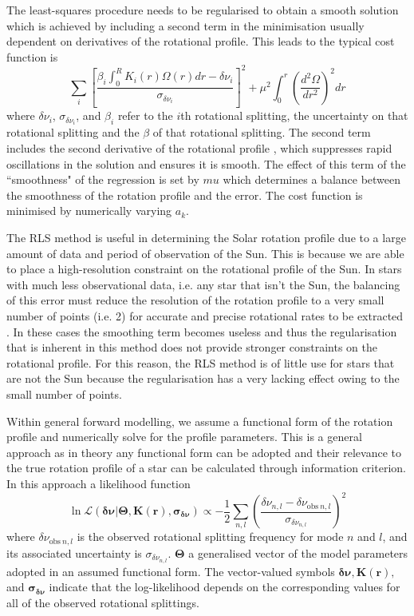 The least-squares procedure needs to be regularised to obtain a smooth solution which is achieved by including a second term in the minimisation usually dependent on derivatives of the rotational profile.
This leads to the typical cost function is
\begin{equation}
    \sum_i \left[ \frac{ \beta_{i} \int^R_0 K_i(r) \Omega(r)  dr - \delta \nu_i }{\sigma_{\delta \nu_i}} \right]^2 + \mu^2 \int^r_0 \left(\frac{d^2 \Omega}{d r^2}\right)^2 d r    
\end{equation}
where $\delta \nu_i$, $\sigma_{\delta \nu_i}$, and $\beta_i$ refer to the $i$th rotational splitting, the uncertainty on that rotational splitting and the $\beta$ of that rotational splitting.
The second term includes the second derivative of the rotational profile \citep{craig_inverse_1986}, which suppresses rapid oscillations in the solution and ensures it is smooth. 
The effect of this term of the ``smoothness" of the regression is set by $mu$ which determines a balance between the smoothness of the rotation profile and the error.
The cost function is minimised by numerically varying $a_k$.

The RLS method is useful in determining the Solar rotation profile due to a large amount of data and period of observation of the Sun. 
This is because we are able to place a high-resolution constraint on the rotational profile of the Sun. In stars with much less observational data, i.e. any star that isn't the Sun, the balancing of this error must reduce the resolution of the rotation profile to a very small number of points (i.e. 2) for accurate and precise rotational rates to be extracted \citep{christensen-dalsgaard_comparison_1990}. 
In these cases the smoothing term becomes useless and thus the regularisation that is inherent in this method does not provide stronger constraints on the rotational profile. 
For this reason, the RLS method is of little use for stars that are not the Sun because the regularisation has a very lacking effect owing to the small number of points.

Within general forward modelling, we assume a functional form of the rotation profile and numerically solve for the profile parameters.
This is a general approach as in theory any functional form can be adopted and their relevance to the true rotation profile of a star can be calculated through information criterion.
In this approach a likelihood function
\begin{equation}
    \ln \mathcal{L}( \pmb{ \delta\nu } | \pmb{\Theta}, \mathbf{{K}(r)}, \pmb{ \sigma_{\delta\nu} } ) \propto -\frac{1}{2}\sum_{n,l}\left(\frac{\delta \nu_{n,l} - \delta \nu_{\mathrm{obs} \ n,l}}{\sigma_{\delta \nu_{n,l}}}\right)^2 
    \label{eqn:lnl}
\end{equation}
where $\delta\nu_{\mathrm{obs} \ n,l}$ is the observed rotational splitting frequency for mode $n$ and $l$, and its associated uncertainty is $\sigma_{\delta\nu_{n,l}}$.
$\pmb{\Theta}$ a generalised vector of the model parameters adopted in an assumed functional form.
The vector-valued symbols $\pmb{ \delta\nu }, \mathbf{{K}(r)}, $ and $ \pmb{ \sigma_{\delta\nu} }$ indicate that the log-likelihood depends on the corresponding values for all of the observed rotational splittings.

